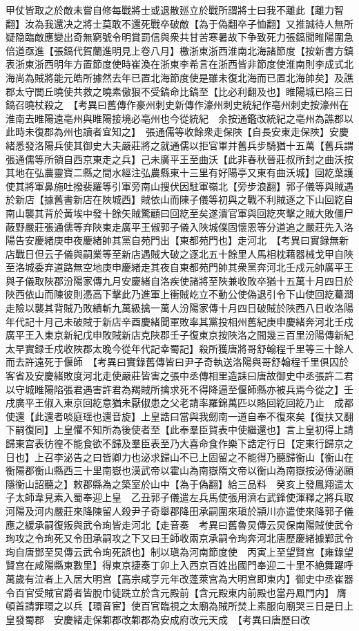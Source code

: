 甲仗皆取之於敵未嘗自修每戰將士或退散廵立於戰所謂將士曰我不離此【離力智翻】汝為我還决之將士莫敢不還死戰卒破敵【為于偽翻卒子恤翻】又推誠待人無所疑隐臨敵應變出奇無窮號令明賞罰信與衆共甘苦寒暑故下争致死力張鎬聞睢陽圍急倍道亟進【張鎬代賀蘭進明見上卷八月】檄浙東浙西淮南北海諸節度【按新書方鎮表浙東浙西明年方置節度使時崔渙在浙東李希言在浙西皆非節度使淮南則李成式北海尚為賊將能元皓所據然去年已置北海節度使是雖未復北海而已置北海帥矣】及譙郡太守閭丘曉使共救之曉素傲狠不受鎬命比鎬至【比必利翻及也】睢陽城已陷三日鎬召曉杖殺之　【考異曰舊傳作豪州刺史新傳作濠州刺史統紀作亳州刺史按濠州在淮南去睢陽遠亳州與睢陽接境必亳州也今從統紀　余按通鑑改統紀之亳州為譙郡以此時未復郡為州也讀者宜知之】　張通儒等收餘衆走保陜【自長安東走保陜】安慶緒悉發洛陽兵使其御史大夫嚴莊將之就通儒以拒官軍并舊兵步騎猶十五萬【舊兵謂張通儒等所領自西京東走之兵】己未廣平王至曲沃【此非春秋晉莊叔所封之曲沃按其地在弘農靈寶二縣之間水經注弘農縣東十三里有好陽亭又東有曲沃城】回紇葉護使其將軍鼻施吐撥裴羅等引軍旁南山搜伏因駐軍嶺北【旁步浪翻】郭子儀等與賊遇於新店【據舊書新店在陜城西】賊依山而陳子儀等初與之戰不利賊逐之下山回紇自南山襲其背於黃埃中發十餘矢賊驚顧曰回紇至矣遂潰官軍與回紇夾擊之賊大敗僵尸蔽野嚴莊張通儒等弃陜東走廣平王俶郭子儀入陜城僕固懷恩等分道追之嚴莊先入洛陽告安慶緒庚申夜慶緒帥其黨自苑門出【東都苑門也】走河北　【考異曰實録無新店戰日但云子儀與嗣業等至新店遇賊大破之逐北五十餘里人馬相枕藉器械戈甲自陜至洛城委弃道路無空地庚申慶緒走其夜自東都苑門帥其衆黨奔河北壬戍元帥廣平王與子儀取陜郡汾陽家傳九月安慶緒自洛疾使諸將至陜兼收敗卒猶十五萬十月四日於陜西依山而陳彼則憑高下擊此乃進軍上衝賊屹立不動公使偽退引令下山使回紇驀澗走險以襲其背賊乃敗績斬九萬級擒一萬人汾陽家傳十月四日破賊於陜西八日收洛陽年代記十月己未破賊于新店辛酉慶緒聞軍敗率其黨投相州舊紀庚申慶緒奔河北壬戍廣平王入東京新紀戊申敗賊新店克陜郡壬子復東京按陜洛之間幾三百里汾陽傳新紀太早實録壬戍收陜郡太晚今從年代記幸蜀記】殺所獲唐將哥舒翰程千里等三十餘人而去許遠死于偃師　【考異曰實錄舊傳皆曰尹子奇執送洛陽與哥舒翰程千里俱囚於客省及安慶緒敗度河北走使嚴莊皆害之張中丞傳相里造誄曰唐故御史中丞張許二君以守城睢陽陷張君遇害許君為羯賊所擒求死不得降逼至偃師縣亦被兵焉今從之】壬戌廣平王俶入東京回紇意猶未厭俶患之父老請率羅錦萬匹以賂回紇回紇乃止　成都使還【此還者啖庭瑶也還音旋】上皇誥曰當與我劒南一道自奉不復來矣【復扶又翻下嗣復同】上皇懼不知所為後使者至【此奉羣臣賀表中使繼還也】言上皇初得上請歸東宫表彷徨不能食欲不歸及羣臣表至乃大喜命食作樂下誥定行日【定東行歸京之日也】上召李泌告之曰皆卿力也泌求歸山不已上固留之不能得乃聽歸衡山【衡山在衡陽郡衡山縣西三十里南嶽也漢武帝以霍山為南嶽隋文帝以衡山為南嶽按泌傳泌願隱衡山詔聽之】敕郡縣為之築室於山中【為于偽翻】給三品料　癸亥上發鳳翔遣太子太師韋見素入蜀奉迎上皇　乙丑郭子儀遣左兵馬使張用濟右武鋒使渾釋之將兵取河陽及河内嚴莊來降陳留人殺尹子奇舉郡降田承嗣圍來瑱於頴川亦遣使來降郭子儀應之緩承嗣復叛與武令珣皆走河北【走音奏　考異曰舊魯炅傳云炅保南陽賊使武令珣攻之令珣死又令田承嗣攻之下又曰王師收兩京承嗣令珣奔河北唐歷慶緒據鄴武令珣自唐鄧至炅傳云武令珣死誤也】制以瑱為河南節度使　丙寅上至望賢宫【雍錄望賢宫在咸陽縣東數里】得東京捷奏丁卯上入西京百姓出國門奉迎二十里不絶舞躍呼萬歲有泣者上入居大明宫【高宗咸亨元年改蓬萊宫為大明宫即東内】御史中丞崔器令百官受賊官爵者皆脫巾徒跣立於含元殿前【含元殿東内前殿也當丹鳳門内】膺頓首請罪環之以兵【環音宦】使百官臨視之太廟為賊所焚上素服向廟哭三日是日上皇發蜀郡　安慶緒走保鄴郡改鄴郡為安成府改元天成　【考異曰唐歷曰改